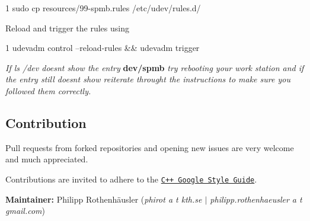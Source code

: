 \begin{DoxyCode}
1 sudo cp resources/99-spmb.rules /etc/udev/rules.d/
\end{DoxyCode}



\begin{DoxyItemize}
\item Reload and trigger the rules using
\end{DoxyItemize}


\begin{DoxyCode}
1 udevadm control --reload-rules && udevadm trigger
\end{DoxyCode}


{\itshape If {\ttfamily ls /dev} doesn\textquotesingle{}t show the entry} {\bfseries dev/spmb} {\itshape try rebooting your work station and if the entry still doesn\textquotesingle{}t show reiterate throught the instructions to make sure you followed them correctly.}





\subsection*{Contribution}

Pull requests from forked repositories and opening new issues are very welcome and much appreciated.

Contributions are invited to adhere to the \href{https://google.github.io/styleguide/cppguide.html}{\tt C++ Google Style Guide}.

{\bfseries Maintainer\+:} Philipp Rothenhäusler ({\itshape phirot a t kth.\+se $\vert$ philipp.\+rothenhaeusler a t gmail.\+com}) 